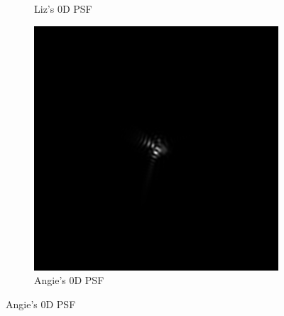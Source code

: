 \documentclass{article}
\begin{document}
\begin{figure}[H]
\begin{subfigure}{.3\textwidth}
  \caption{Liz's 0D PSF}
  \label{fig:liz0dpsf}
\end{subfigure}
\begin{subfigure}{.3\textwidth}
  \centering
  \includegraphics[width=1\linewidth]{Angie_R_0526_1_500_zer_0_5_PSF.png}
  \caption{Angie's 0D PSF}
  \label{fig:angie0dpsf}
\end{subfigure}

\medskip


\end{figure}
\end{document}

